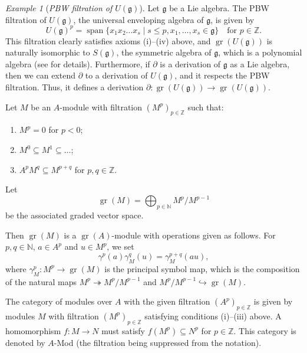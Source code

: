 \documentclass[a4paper, 12pt, reqno]{amsart}
\theoremstyle{remark}
\newtheorem{example}[theorem]{Example}
\DeclareMathOperator{\gr}{gr}
\DeclareMathOperator{\vspan}{span}
\begin{document}
\begin{example}[\emph{PBW filtration of $U(\mathfrak{g})$}]
  \label{exa:1}
  Let $\mathfrak{g}$ be a Lie algebra.
  The PBW filtration of $U(\mathfrak{g})$, the universal enveloping algebra of $\mathfrak{g}$, is given by
  \begin{equation*}
    U(\mathfrak{g})^p = \vspan\{x_1x_2\dots x_s \mid s \le p, x_1, \dots, x_s \in \mathfrak{g}\} \quad \text{for $p \in \mathbb{Z}$}.
  \end{equation*}
  This filtration clearly satisfies axioms (i)--(iv) above, and $\gr(U(\mathfrak{g}))$ is naturally isomorphic to $S(\mathfrak{g})$, the symmetric algebra of $\mathfrak{g}$, which is a polynomial algebra (see \cite[\S2]{dixmier_enveloping_1996} for details).
  Furthermore, if $\partial$ is a derivation of $\mathfrak{g}$ as a Lie algebra, then we can extend $\partial$ to a derivation of $U(\mathfrak{g})$, and it respects the PBW filtration.
  Thus, it defines a derivation $\partial: \gr(U(\mathfrak{g})) \to \gr(U(\mathfrak{g}))$.
\end{example}

Let $M$ be an $A$-module with filtration $(M^p)_{p \in \mathbb{Z}}$ such that:
\begin{enumerate}
\item $M^p = 0$ for $p < 0$;
\item $M^0 \subseteq M^1 \subseteq \dots$;
\item $A^pM^q \subseteq M^{p + q}$ for $p, q \in \mathbb{Z}$.
\end{enumerate}
Let
\begin{equation*}
  \gr(M) = \bigoplus_{p \in \mathbb{N}}M^p/M^{p - 1}
\end{equation*}
be the associated graded vector space.

Then $\gr(M)$ is a $\gr(A)$-module with operations given as follows.
For $p, q \in \mathbb{N}$, $a \in A^p$ and $u \in M^p$, we set
\begin{equation*}
  \gamma^p(a)\gamma^q_M(u) = \gamma^{p + q}_M(au),
\end{equation*}
where $\gamma^p_M: M^p \to \gr(M)$ is the principal symbol map, which is the composition of the natural maps $M^p \twoheadrightarrow M^p/M^{p - 1}$ and $M^p/M^{p - 1} \hookrightarrow \gr(M)$.

The category of modules over $A$ with the given filtration $(A^p)_{p \in \mathbb{Z}}$ is given by modules $M$ with filtration $(M^p)_{p \in \mathbb{Z}}$ satisfying conditions (i)--(iii) above.
A homomorphism $f: M \to N$ must satisfy $f(M^p) \subseteq N^p$ for $p \in \mathbb{Z}$.
This category is denoted by $A$-Mod (the filtration being suppressed from the notation).
\end{document}
